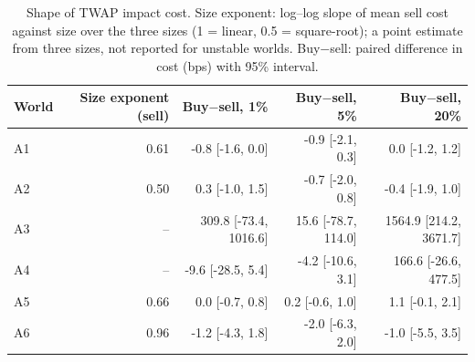 \begin{table}[!htbp]
\centering\footnotesize
\caption{Shape of TWAP impact cost. Size exponent: log--log slope of mean sell cost against size over the three sizes (1 = linear, 0.5 = square-root); a point estimate from three sizes, not reported for unstable worlds. Buy$-$sell: paired difference in cost (bps) with 95\% interval.}\label{tab:impact}
\begin{tabular}{lrrrr}
\toprule
World & Size exponent (sell) & Buy$-$sell, 1\% & Buy$-$sell, 5\% & Buy$-$sell, 20\% \\
\midrule
A1 & 0.61 & -0.8 [-1.6, 0.0] & -0.9 [-2.1, 0.3] & 0.0 [-1.2, 1.2] \\
A2 & 0.50 & 0.3 [-1.0, 1.5] & -0.7 [-2.0, 0.8] & -0.4 [-1.9, 1.0] \\
A3 & -- & 309.8 [-73.4, 1016.6] & 15.6 [-78.7, 114.0] & 1564.9 [214.2, 3671.7] \\
A4 & -- & -9.6 [-28.5, 5.4] & -4.2 [-10.6, 3.1] & 166.6 [-26.6, 477.5] \\
A5 & 0.66 & 0.0 [-0.7, 0.8] & 0.2 [-0.6, 1.0] & 1.1 [-0.1, 2.1] \\
A6 & 0.96 & -1.2 [-4.3, 1.8] & -2.0 [-6.3, 2.0] & -1.0 [-5.5, 3.5] \\
\bottomrule
\end{tabular}
\end{table}
